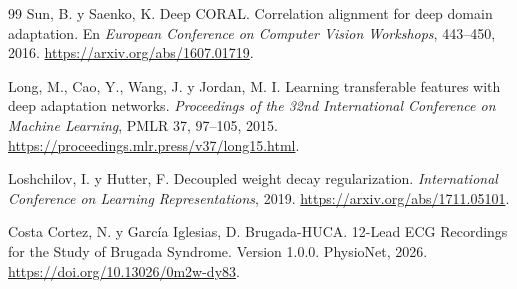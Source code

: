 \begin{thebibliography}{99}
Sun, B. y Saenko, K.
\newblock Deep CORAL. Correlation alignment for deep domain adaptation.
\newblock En \emph{European Conference on Computer Vision Workshops}, 443--450, 2016.
\newblock \url{https://arxiv.org/abs/1607.01719}.

Long, M., Cao, Y., Wang, J. y Jordan, M. I.
\newblock Learning transferable features with deep adaptation networks.
\newblock \emph{Proceedings of the 32nd International Conference on Machine Learning}, PMLR 37, 97--105, 2015.
\newblock \url{https://proceedings.mlr.press/v37/long15.html}.

Loshchilov, I. y Hutter, F.
\newblock Decoupled weight decay regularization.
\newblock \emph{International Conference on Learning Representations}, 2019.
\newblock \url{https://arxiv.org/abs/1711.05101}.

\par\smallskip
{}
Costa Cortez, N. y García Iglesias, D.
\newblock Brugada-HUCA. 12-Lead ECG Recordings for the Study of Brugada Syndrome. Version 1.0.0.
\newblock PhysioNet, 2026.
\newblock \url{https://doi.org/10.13026/0m2w-dy83}.

\end{thebibliography}
